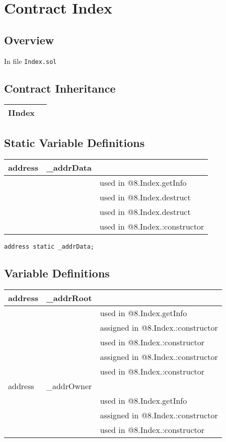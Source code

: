
\chapter{Contract Index}

\minitoc

\section{Overview}


In file {\tt Index.sol}

\section{Contract Inheritance}


\noindent\begin{tabular}{|l|p{5cm}|}\hline
IIndex & \\\hline
\end{tabular}


\section{Static Variable Definitions}


\ifsoltables
\noindent\begin{tabular}{|l|l|p{5cm}|}\hline
address & \_{}addrData &  \\\hline
 & & used in @8.Index.getInfo\\\hline
 & & used in @8.Index.destruct\\\hline
 & & used in @8.Index.destruct\\\hline
 & & used in @8.Index.:constructor\\\hline
\end{tabular}
\fi


\begin{lstlisting}[firstnumber=11]
    address static _addrData;
\end{lstlisting}

\section{Variable Definitions}


\ifsoltables
\noindent\begin{tabular}{|l|l|p{5cm}|}\hline
address & \_{}addrRoot &  \\\hline
 & & used in @8.Index.getInfo\\\hline
 & & assigned in @8.Index.:constructor\\\hline
 & & used in @8.Index.:constructor\\\hline
 & & assigned in @8.Index.:constructor\\\hline
 & & used in @8.Index.:constructor\\\hline
address & \_{}addrOwner &  \\\hline
 & & used in @8.Index.getInfo\\\hline
 & & assigned in @8.Index.:constructor\\\hline
 & & used in @8.Index.:constructor\\\hline
\end{tabular}
\fi


